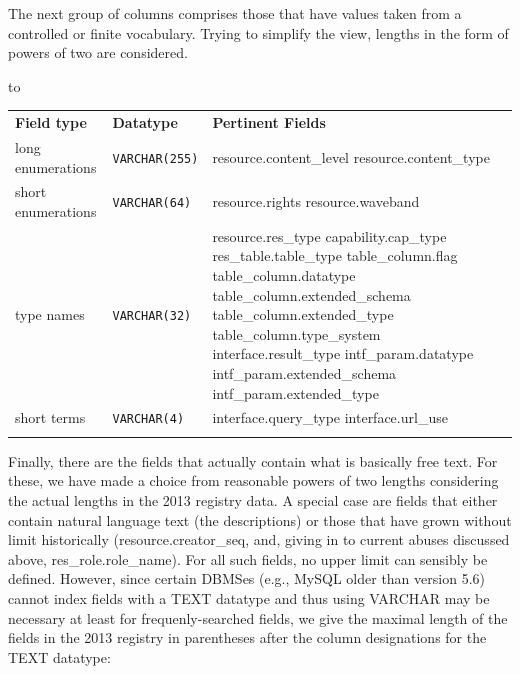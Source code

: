 \documentclass[11pt,a4paper]{ivoa}
\newcommand{\sptablerule}{\noalign{\vspace{2pt}}\hline\noalign{\vspace{2pt}}}
\newenvironment{inlinetable}{\vfil\penalty8000\vfilneg%
    \hbox to\hsize\bgroup\hss}
  {\hss\egroup\vspace{8pt}}
\begin{document}
The next group of columns comprises those that have values taken from
a controlled or finite vocabulary.
Trying to simplify the view,
lengths in the form
of powers of two are considered.

\begin{inlinetable}
\begin{tabular}{llp{6cm}}
\sptablerule
\textbf{Field type}&
\textbf{Datatype}&
\textbf{Pertinent Fields}\\
\sptablerule
long enumerations&\texttt{VARCHAR(255)}&resource.content\_level\hfil\break
          resource.content\_type\\
\sptablerule
short enumerations&\texttt{VARCHAR(64)}&
          resource.rights\hfil\break
          resource.waveband\\
\sptablerule
type names&\texttt{VARCHAR(32)}&resource.res\_type\hfil\break
          capability.cap\_type\hfil\break
          res\_table.table\_type\hfil\break
          table\_column.flag\hfil\break
          table\_column.datatype\hfil\break
          table\_column.extended\_schema\hfil\break
          table\_column.extended\_type\hfil\break
          table\_column.type\_system\hfil\break
          interface.result\_type\hfil\break
          intf\_param.datatype\hfil\break
          intf\_param.extended\_schema\hfil\break
          intf\_param.extended\_type\\
\sptablerule
short terms&\texttt{VARCHAR(4)}&interface.query\_type\hfil\break
          interface.url\_use\\
\sptablerule
\end{tabular}
\end{inlinetable}


Finally, there are the fields that actually contain what is
basically free text.
For these, we have made a choice from reasonable powers of two lengths 
considering the actual lengths in the 2013 registry data. 
A special case are fields that either contain natural language text (the
descriptions) or those that have grown without limit historically
(resource.creator\_seq, and, giving in to current abuses discussed above,
res\_role.role\_name).  For all such fields, no upper limit can sensibly
be defined.  However, since certain DBMSes (e.g., MySQL older than
version 5.6) cannot index fields with a TEXT datatype and thus using
VARCHAR may be necessary at least for frequenly-searched fields, we give
the maximal length of the fields in the 2013 registry in parentheses after
the column designations for the TEXT datatype:
\end{document}

